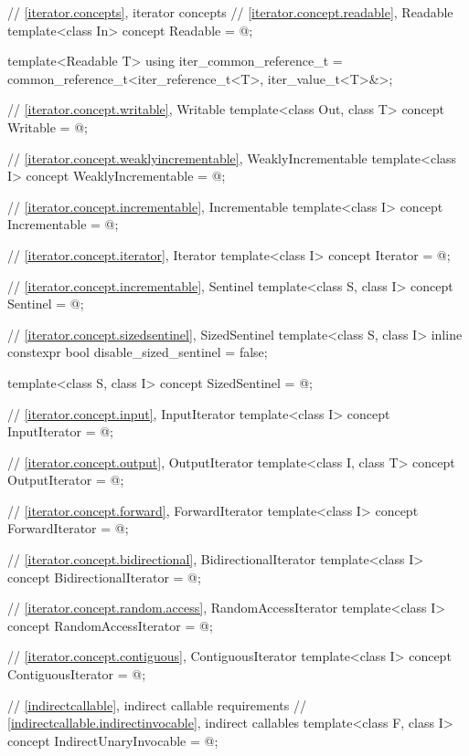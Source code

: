 \begin{addedblock}
\begin{codeblock}
  // \ref{iterator.concepts}, iterator concepts
  // \ref{iterator.concept.readable}, Readable
  template<class In>
    concept Readable = @\seebelownc@;

  template<Readable T>
    using iter_common_reference_t =
      common_reference_t<iter_reference_t<T>, iter_value_t<T>&>;

  // \ref{iterator.concept.writable}, Writable
  template<class Out, class T>
    concept Writable = @\seebelownc@;

  // \ref{iterator.concept.weaklyincrementable}, WeaklyIncrementable
  template<class I>
    concept WeaklyIncrementable = @\seebelownc@;

  // \ref{iterator.concept.incrementable}, Incrementable
  template<class I>
    concept Incrementable = @\seebelownc@;

  // \ref{iterator.concept.iterator}, Iterator
  template<class I>
    concept Iterator = @\seebelownc@;

  // \ref{iterator.concept.incrementable}, Sentinel
  template<class S, class I>
    concept Sentinel = @\seebelownc@;

  // \ref{iterator.concept.sizedsentinel}, SizedSentinel
  template<class S, class I>
    inline constexpr bool disable_sized_sentinel = false;

  template<class S, class I>
    concept SizedSentinel = @\seebelownc@;

  // \ref{iterator.concept.input}, InputIterator
  template<class I>
    concept InputIterator = @\seebelownc@;

  // \ref{iterator.concept.output}, OutputIterator
  template<class I, class T>
    concept OutputIterator = @\seebelownc@;

  // \ref{iterator.concept.forward}, ForwardIterator
  template<class I>
    concept ForwardIterator = @\seebelownc@;

  // \ref{iterator.concept.bidirectional}, BidirectionalIterator
  template<class I>
    concept BidirectionalIterator = @\seebelownc@;

  // \ref{iterator.concept.random.access}, RandomAccessIterator
  template<class I>
    concept RandomAccessIterator = @\seebelownc@;

  // \ref{iterator.concept.contiguous}, ContiguousIterator
  template<class I>
    concept ContiguousIterator = @\seebelownc@;

  // \ref{indirectcallable}, indirect callable requirements
  // \ref{indirectcallable.indirectinvocable}, indirect callables
  template<class F, class I>
    concept IndirectUnaryInvocable = @\seebelownc@;


\end{codeblock}
\end{addedblock}
